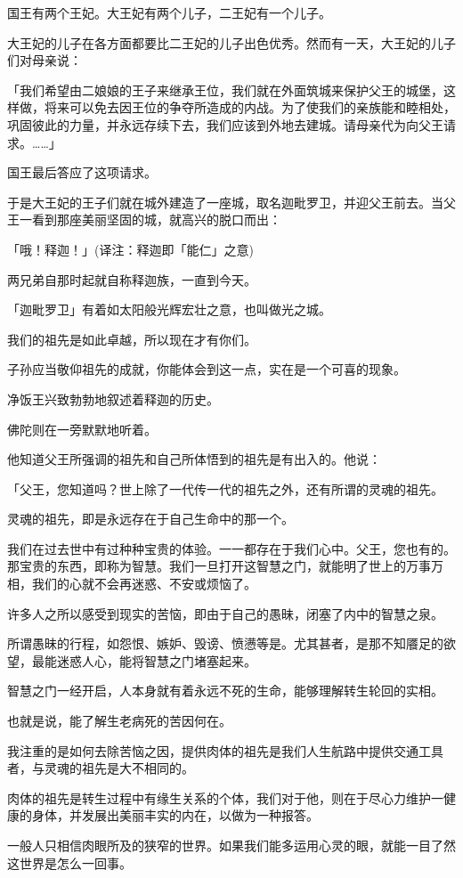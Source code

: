 \documentclass[twoside,openany]{book}
\begin{document}
国王有两个王妃。大王妃有两个儿子，二王妃有一个儿子。

大王妃的儿子在各方面都要比二王妃的儿子出色优秀。然而有一天，大王妃的儿子们对母亲说：

「我们希望由二娘娘的王子来继承王位，我们就在外面筑城来保护父王的城堡，这样做，将来可以免去因王位的争夺所造成的内战。为了使我们的亲族能和睦相处，巩固彼此的力量，并永远存续下去，我们应该到外地去建城。请母亲代为向父王请求。……」

国王最后答应了这项请求。

于是大王妃的王子们就在城外建造了一座城，取名迦毗罗卫，并迎父王前去。当父王一看到那座美丽坚固的城，就高兴的脱口而出：

「哦！释迦！」(译注：释迦即「能仁」之意)

两兄弟自那时起就自称释迦族，一直到今天。

「迦毗罗卫」有着如太阳般光辉宏壮之意，也叫做光之城。

我们的祖先是如此卓越，所以现在才有你们。

子孙应当敬仰祖先的成就，你能体会到这一点，实在是一个可喜的现象。

净饭王兴致勃勃地叙述着释迦的历史。

佛陀则在一旁默默地听着。

他知道父王所强调的祖先和自己所体悟到的祖先是有出入的。他说：

「父王，您知道吗？世上除了一代传一代的祖先之外，还有所谓的灵魂的祖先。

灵魂的祖先，即是永远存在于自己生命中的那一个。

我们在过去世中有过种种宝贵的体验。一一都存在于我们心中。父王，您也有的。那宝贵的东西，即称为智慧。我们一旦打开这智慧之门，就能明了世上的万事万相，我们的心就不会再迷惑、不安或烦恼了。

许多人之所以感受到现实的苦恼，即由于自己的愚昧，闭塞了内中的智慧之泉。

所谓愚昧的行程，如怨恨、嫉妒、毁谤、愤懑等是。尤其甚者，是那不知餍足的欲望，最能迷惑人心，能将智慧之门堵塞起来。

智慧之门一经开启，人本身就有着永远不死的生命，能够理解转生轮回的实相。

也就是说，能了解生老病死的苦因何在。

我注重的是如何去除苦恼之因，提供肉体的祖先是我们人生航路中提供交通工具者，与灵魂的祖先是大不相同的。

肉体的祖先是转生过程中有缘生关系的个体，我们对于他，则在于尽心力维护一健康的身体，并发展出美丽丰实的内在，以做为一种报答。

一般人只相信肉眼所及的狭窄的世界。如果我们能多运用心灵的眼，就能一目了然这世界是怎么一回事。
\end{document}
